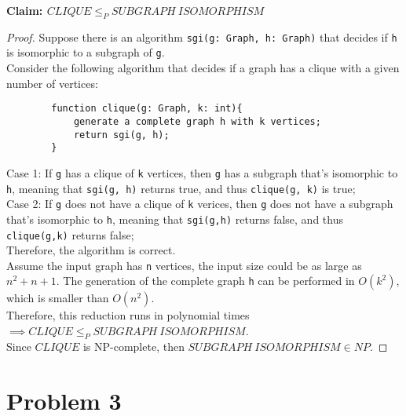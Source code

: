 \documentclass[letterpaper]{article}
\begin{document}
\textbf{Claim: $CLIQUE \leq_{P} SUBGRAPH\ ISOMORPHISM$}
\begin{proof}
    Suppose there is an algorithm \verb#sgi(g: Graph, h: Graph)# that decides if \verb#h# is isomorphic to a subgraph of \verb#g#.\\
    Consider the following algorithm that decides if a graph has a clique with a given number of vertices:
    \begin{verbatim}
        function clique(g: Graph, k: int){
            generate a complete graph h with k vertices;
            return sgi(g, h);
        }
    \end{verbatim}
    Case 1: If \verb#g# has a clique of \verb#k# vertices, then \verb#g# has a subgraph that's isomorphic to \verb#h#, meaning that \verb#sgi(g, h)# returns true, and thus \verb#clique(g, k)# is true;\\
    Case 2: If \verb#g# does not have a clique of \verb#k# verices, then \verb#g# does not have a subgraph that's isomorphic to \verb#h#, meaning that \verb#sgi(g,h)# returns false, and thus \verb#clique(g,k)# returns false;\\

    Therefore, the algorithm is correct.\\

    Assume the input graph has \verb#n# vertices, the input size could be as large as $n^2+n+1$. The generation of the complete graph \verb#h# can be performed in $O(k^2)$, which is smaller than $O(n^2)$.\\

    Therefore, this reduction runs in polynomial times $\implies CLIQUE \leq_{P} SUBGRAPH\ ISOMORPHISM$.\\

    Since $CLIQUE$ is NP-complete, then $SUBGRAPH\ ISOMORPHISM \in NP$.

\end{proof}

\section*{Problem 3}
\end{document}
